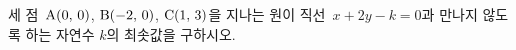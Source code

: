 세 점~$\mathrm{A}(0,\mkern3mu 0)$, $\mathrm{B}(-2,\mkern3mu 0)$, $\mathrm{C}(1,\mkern3mu 3)$을 지나는 원이 직선~$x+2y-k=0$과 만나지 않도록 하는 자연수 $k$의 최솟값을 구하시오.
